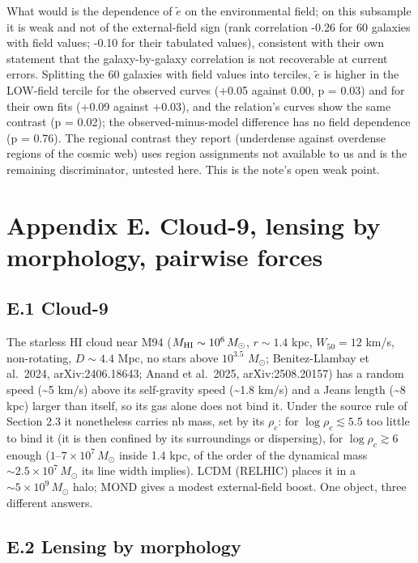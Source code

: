 \documentclass[
  10pt,
]{article}
\begin{document}
What would is the dependence of $\tilde e$ on the environmental field; on this subsample it is weak and not of the external-field sign (rank correlation -0.26 for 60 galaxies with field values; -0.10 for their tabulated values), consistent with their own statement that the galaxy-by-galaxy correlation is not recoverable at current errors. Splitting the 60 galaxies with field values into terciles, $\tilde e$ is higher in the LOW-field tercile for the observed curves (+0.05 against 0.00, p = 0.03) and for their own fits (+0.09 against +0.03), and the relation's curves show the same contrast (p = 0.02); the observed-minus-model difference has no field dependence (p = 0.76). The regional contrast they report (underdense against overdense regions of the cosmic web) uses region assignments not available to us and is the remaining discriminator, untested here. This is the note's open weak point.

\section{Appendix E. Cloud-9, lensing by morphology, pairwise forces}\label{appendix-e.-cloud-9-lensing-by-morphology-pairwise-forces}

\subsection{E.1 Cloud-9}

The starless HI cloud near M94 ($M_{\rm HI}\sim10^6\,M_\odot$, $r\sim1.4$ kpc, $W_{50}=12$ km/s, non-rotating,
$D\sim4.4$ Mpc, no stars above $10^{3.5}$ $M_\odot$;
Benitez-Llambay et al.~2024, arXiv:2406.18643; Anand et al.~2025,
arXiv:2508.20157) has a random
speed (\textasciitilde{}5 km/s) above its self-gravity speed
(\textasciitilde{}1.8 km/s) and a Jeans length (\textasciitilde{}8 kpc)
larger than itself, so its gas alone does not bind it. Under the source rule of
Section 2.3 it nonetheless carries nb mass, set by its $\rho_c$: for
$\log\rho_c\lesssim5.5$ too little to bind it (it is then confined by its
surroundings or dispersing), for $\log\rho_c\gtrsim6$ enough
($1$--$7\times10^7\,M_\odot$ inside 1.4 kpc, of the order of the dynamical mass
$\sim2.5\times10^7\,M_\odot$ its line width implies). LCDM (RELHIC) places it in a
$\sim5\times10^9\,M_\odot$ halo; MOND gives a modest external-field boost.
One object, three different answers.

\subsection{E.2 Lensing by morphology}
\end{document}
